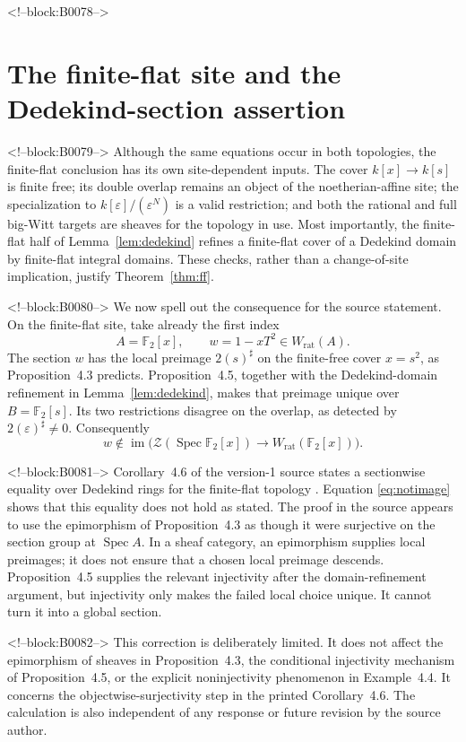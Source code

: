 \documentclass[11pt]{article}
\theoremstyle{definition}
\newcommand{\Spec}{\operatorname{Spec}}
\newcommand{\Wrat}{W_{\mathrm{rat}}}
\newcommand{\Zsh}{\mathcal Z}
\newcommand{\sh}{\sharp}
\begin{document}
<!--block:B0078-->
\section{The finite-flat site and the Dedekind-section assertion}
\label{sec:finiteflat}

<!--block:B0079-->
Although the same equations occur in both topologies, the finite-flat
conclusion has its own site-dependent inputs.  The cover
\(k[x]\to k[s]\) is finite free; its double overlap remains an object of
the noetherian-affine site; the specialization to
\(k[\varepsilon]/(\varepsilon^N)\) is a valid restriction; and both the
rational and full big-Witt targets are sheaves for the topology in use.
Most importantly, the finite-flat half of
Lemma~\ref{lem:dedekind} refines a finite-flat cover of a Dedekind domain
by finite-flat integral domains.  These checks, rather than a change-of-site
implication, justify Theorem~\ref{thm:ff}.

<!--block:B0080-->
We now spell out the consequence for the source statement.  On the
finite-flat site, take already the first index
\[
 A=\mathbb F_2[x],\qquad w=1-xT^2\in\Wrat(A).
 \tag{6.1}\label{eq:cor46example}
\]
The section \(w\) has the local preimage \(2(s)^\sh\) on the finite-free
cover \(x=s^2\), as Proposition~4.3 predicts.  Proposition~4.5, together
with the Dedekind-domain refinement in Lemma~\ref{lem:dedekind}, makes that
preimage unique over \(B=\mathbb F_2[s]\).  Its two restrictions disagree
on the overlap, as detected by \(2(\varepsilon)^\sh\ne0\).  Consequently
\[
 w\notin
 \operatorname{im}\bigl(
 \Zsh(\Spec\mathbb F_2[x])\longrightarrow
 \Wrat(\mathbb F_2[x])\bigr).
 \tag{6.2}\label{eq:notimage}
\]

<!--block:B0081-->
Corollary~4.6 of the version-1 source states a sectionwise equality over
Dedekind rings for the finite-flat topology
\cite[p.~23]{Deninger2025Rational}.  Equation \eqref{eq:notimage} shows
that this equality does not hold as stated.  The proof in the source
appears to use the epimorphism of Proposition~4.3 as though it were
surjective on the section group at \(\Spec A\).  In a sheaf category, an
epimorphism supplies local preimages; it does not ensure that a chosen
local preimage descends.  Proposition~4.5 supplies the relevant
injectivity after the domain-refinement argument, but injectivity only
makes the failed local choice unique.  It cannot turn it into a global
section.

<!--block:B0082-->
This correction is deliberately limited.  It does not affect the
epimorphism of sheaves in Proposition~4.3, the conditional injectivity
mechanism of Proposition~4.5, or the explicit noninjectivity phenomenon in
Example~4.4.  It concerns the objectwise-surjectivity step in the printed
Corollary~4.6.  The calculation is also independent of any response or
future revision by the source author.
\end{document}
